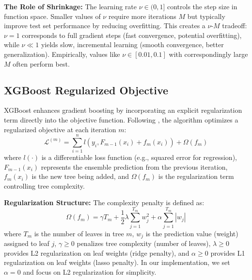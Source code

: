 \documentclass[10pt,twocolumn]{article}
\begin{document}
\textbf{The Role of Shrinkage:} The learning rate $\nu \in (0,1]$ controls the step size in function space. Smaller values of $\nu$ require more iterations $M$ but typically improve test set performance by reducing overfitting. This creates a $\nu$-$M$ tradeoff: $\nu = 1$ corresponds to full gradient steps (fast convergence, potential overfitting), while $\nu \ll 1$ yields slow, incremental learning (smooth convergence, better generalization). Empirically, values like $\nu \in [0.01, 0.1]$ with correspondingly large $M$ often perform best.

\subsection{XGBoost Regularized Objective}

XGBoost enhances gradient boosting by incorporating an explicit regularization term directly into the objective function. Following \cite{chen2016xgboost}, the algorithm optimizes a regularized objective at each iteration $m$:
\begin{equation}
\mathcal{L}^{(m)} = \sum_{i=1}^n l(y_i, F_{m-1}(x_i) + f_m(x_i)) + \Omega(f_m)
\end{equation}
where $l(\cdot)$ is a differentiable loss function (e.g., squared error for regression), $F_{m-1}(x_i)$ represents the ensemble prediction from the previous iteration, $f_m(x_i)$ is the new tree being added, and $\Omega(f_m)$ is the regularization term controlling tree complexity.

\textbf{Regularization Structure:} The complexity penalty is defined as:
\begin{equation}
\Omega(f_m) = \gamma T_m + \frac{1}{2}\lambda \sum_{j=1}^{T_m} w_j^2 + \alpha \sum_{j=1}^{T_m} |w_j|
\end{equation}
where $T_m$ is the number of leaves in tree $m$, $w_j$ is the prediction value (weight) assigned to leaf $j$, $\gamma \geq 0$ penalizes tree complexity (number of leaves), $\lambda \geq 0$ provides L2 regularization on leaf weights (ridge penalty), and $\alpha \geq 0$ provides L1 regularization on leaf weights (lasso penalty). In our implementation, we set $\alpha = 0$ and focus on L2 regularization for simplicity.
\end{document}
